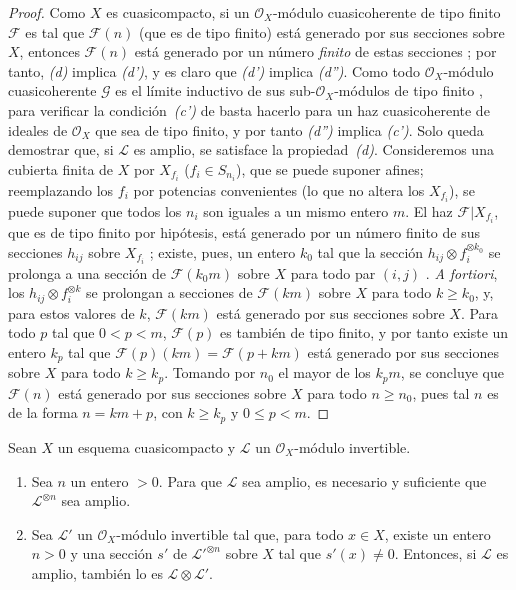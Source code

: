 \documentclass[oneside,10pt]{amsart}
\renewcommand{\leq}{\leqslant}
\renewcommand{\geq}{\geqslant}
\newcommand{\oldpage}[2][]{\marginnote{\normalfont\footnotesize\textbf{#1}~|~#2}\ignorespaces}
\let\EGAOriginalLabel\label
\renewcommand{\label}[1]{\phantomsection\EGAOriginalLabel{#1}}
\begin{document}
\begin{proof}
Como $X$ es cuasicompacto, si un $\mathcal{O}_X$-módulo cuasicoherente de tipo finito $\mathcal{F}$ es tal que $\mathcal{F}(n)$ (que es de tipo finito) está generado por sus secciones sobre $X$, entonces $\mathcal{F}(n)$ está generado por un número \emph{finito} de estas secciones ;
por tanto, \emph{(d)} implica \emph{(d')}, y es claro que \emph{(d')} implica \emph{(d'')}.
Como todo $\mathcal{O}_X$-módulo cuasicoherente $\mathcal{G}$ es el límite inductivo de sus sub-$\mathcal{O}_X$-módulos de tipo finito , para verificar la condición~\emph{(c')} de  basta hacerlo para un haz cuasicoherente de ideales de $\mathcal{O}_X$ que sea de tipo finito, y por tanto \emph{(d'')} implica \emph{(c')}.
Solo queda demostrar que, si $\mathcal{L}$ es amplio, se satisface la propiedad~\emph{(d)}.
Consideremos una cubierta finita de $X$ por $X_{f_i}$ ($f_i\in S_{n_i}$), que se puede suponer afines;
reemplazando los $f_i$ por potencias convenientes (lo que no altera los $X_{f_i}$), se puede suponer que todos los $n_i$ son iguales a un mismo entero $m$.
El haz $\mathcal{F}|X_{f_i}$, que es de tipo finito por hipótesis, está generado por un número finito de sus secciones $h_{ij}$ sobre $X_{f_i}$ ;
existe, pues, un entero $k_0$ tal que la sección $h_{ij}\otimes f_i^{\otimes k_0}$ se prolonga a una sección de $\mathcal{F}(k_0m)$ sobre $X$ para todo par $(i,j)$ .
\emph{A fortiori}, los $h_{ij}\otimes f_i^{\otimes k}$ se prolongan a secciones de $\mathcal{F}(km)$ sobre $X$ para todo $k\geq k_0$, y, para estos valores de $k$, $\mathcal{F}(km)$ está generado por sus secciones sobre $X$.
Para todo $p$ tal que $0<p<m$, $\mathcal{F}(p)$ es también de tipo finito, y por tanto existe un entero $k_p$ tal que $\mathcal{F}(p)(km)=\mathcal{F}(p+km)$ está generado por sus secciones sobre $X$ para todo $k\geq k_p$.
Tomando por $n_0$ el mayor de los $k_pm$, se concluye que $\mathcal{F}(n)$ está generado por sus secciones sobre $X$ para todo $n\geq n_0$, pues tal $n$ es de la forma $n=km+p$, con $k\geq k_p$ y $0\leq p<m$.
\end{proof}

\begin{proposition}[4.5.6]
\label{II.4.5.6-fr}
Sean $X$ un esquema cuasicompacto y $\mathcal{L}$ un $\mathcal{O}_X$-módulo invertible.
\begin{enumerate}
  \item[\rm{(i)}] Sea $n$ un entero $>0$. Para que $\mathcal{L}$ sea amplio, es necesario y suficiente que $\mathcal{L}^{\otimes n}$ sea amplio.
  \item[\rm{(ii)}] Sea $\mathcal{L}'$ un $\mathcal{O}_X$-módulo invertible tal que, para todo $x\in X$, existe un entero $n>0$
\oldpage[II]{86}
    y una sección $s'$ de $\mathcal{L}'^{\otimes n}$ sobre $X$ tal que $s'(x)\neq0$.
    Entonces, si $\mathcal{L}$ es amplio, también lo es $\mathcal{L}\otimes\mathcal{L}'$.
\end{enumerate}
\end{proposition}
\end{document}
